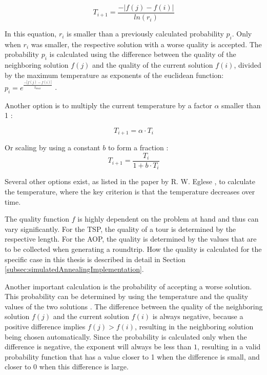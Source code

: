 \begin{equation}\label{eq:temperatureSchedule}
	T_{i+1} = \frac{- |f(j)-f(i)|}{ln(r_i)}	
\end{equation}

In this equation, $r_i$ is smaller than a previously calculated probability $p_i$.
Only when $r_i$ was smaller, the respective solution with a worse quality is accepted. 
The probability $p_i$ is calculated using the difference between the quality of the neighboring solution $f(j)$ and the quality of the current solution $f(i)$, divided by the maximum temperature as exponents of the euclidean function: 
$p_i = e^{\frac{- |f(j)-f(i)|}{t_{max}}}$ \cite{zhan_list-based_2016}.

Another option is to multiply the current temperature by a factor $\alpha$ smaller than 1 \cite{eglese_simulated_1990}:

\begin{equation}\label{eq:temperatureSchedule2}
	T_{i+1} = \alpha \cdot T_i
\end{equation}

Or scaling by using a constant $b$ to form a fraction \cite{eglese_simulated_1990}: 
\begin{equation}\label{eq:temperatureSchedule3}
	T_{i+1} = \frac{T_i}{1 + b \cdot T_i}	
\end{equation}

Several other options exist, as listed in the paper by R. W. Eglese \cite{eglese_simulated_1990}, to calculate the temperature, where the key criterion is that the temperature decreases over time.

The quality function $f$ is highly dependent on the problem at hand and thus can vary significantly. 
For the TSP, the quality of a tour is determined by the respective length.
For the AOP, the quality is determined by the values that are to be collected when generating a roundtrip. 
How the quality is calculated for the specific case in this thesis is described in detail in Section \ref{subsec:simulatedAnnealingImplementation}.

Another important calculation is the probability of accepting a worse solution.
This probability can be determined by using the temperature and the quality values of the two solutions \cite{eglese_simulated_1990}.
The difference between the quality of the neighboring solution $f(j)$ and the current solution $f(i)$ is always negative, because a positive difference implies $f(j) > f(i)$, resulting in the neighboring solution being chosen automatically.
Since the probability is calculated only when the difference is negative, the exponent will always be less than $1$, resulting in a valid probability function that has a value closer to 1 when the difference is small, and closer to $0$ when this difference is large.


